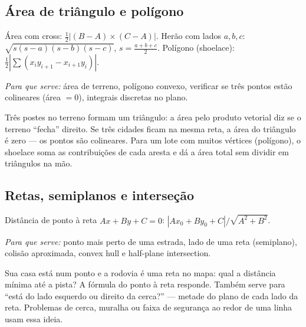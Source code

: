 
\subsection{Área de triângulo e polígono}

Área com cross: $\frac{1}{2}|(B-A)\times(C-A)|$.
Herão com lados $a,b,c$: $\sqrt{s(s-a)(s-b)(s-c)}$, $s=\frac{a+b+c}{2}$.
Polígono (shoelace): $\frac{1}{2}|\sum (x_i y_{i+1} - x_{i+1} y_i)|$.

\emph{Para que serve:} área de terreno, polígono convexo, verificar se três pontos estão colineares (área $=0$), integrais discretas no plano.

\begin{exemplodiabox}
Três postes no terreno formam um triângulo: a área pelo produto vetorial diz se o terreno ``fecha'' direito. Se três cidades ficam na mesma reta, a área do triângulo é zero --- os pontos são colineares. Para um lote com muitos vértices (polígono), o shoelace soma as contribuições de cada aresta e dá a área total sem dividir em triângulos na mão.
\end{exemplodiabox}



\subsection{Retas, semiplanos e interseção}

Distância de ponto à reta $Ax+By+C=0$: $|Ax_0+By_0+C|/\sqrt{A^2+B^2}$.

\emph{Para que serve:} ponto mais perto de uma estrada, lado de uma reta (semiplano), colisão aproximada, convex hull e half-plane intersection.

\begin{exemplodiabox}
Sua casa está num ponto e a rodovia é uma reta no mapa: qual a distância mínima até a pista? A fórmula do ponto à reta responde. Também serve para ``está do lado esquerdo ou direito da cerca?'' --- metade do plano de cada lado da reta. Problemas de cerca, muralha ou faixa de segurança ao redor de uma linha usam essa ideia.
\end{exemplodiabox}



